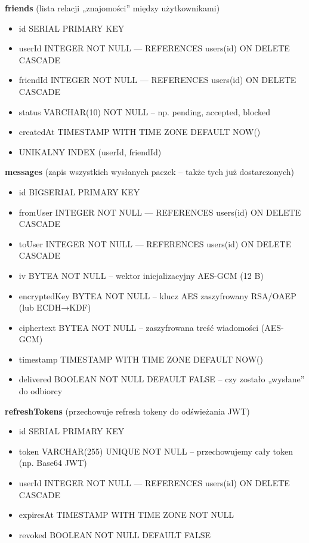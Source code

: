 \documentclass[a4paper,12pt]{article}
\begin{document}
\textbf{friends} (lista relacji „znajomości” między użytkownikami)
\begin{itemize}
    \item id SERIAL PRIMARY KEY
    \item userId INTEGER NOT NULL  — REFERENCES users(id) ON DELETE CASCADE
    \item friendId INTEGER NOT NULL  — REFERENCES users(id) ON DELETE CASCADE
    \item status VARCHAR(10) NOT NULL  – np. pending, accepted, blocked
    \item createdAt TIMESTAMP WITH TIME ZONE DEFAULT NOW()
    \item UNIKALNY INDEX (userId, friendId)
\end{itemize}

\textbf{messages} (zapis wszystkich wysłanych paczek – także tych już dostarczonych)
\begin{itemize}
    \item id BIGSERIAL PRIMARY KEY
    \item fromUser INTEGER NOT NULL  — REFERENCES users(id) ON DELETE CASCADE
    \item toUser INTEGER NOT NULL  — REFERENCES users(id) ON DELETE CASCADE
    \item iv BYTEA NOT NULL  – wektor inicjalizacyjny AES-GCM (12 B)
    \item encryptedKey BYTEA NOT NULL  – klucz AES zaszyfrowany RSA/OAEP (lub ECDH→KDF)
    \item ciphertext BYTEA NOT NULL  – zaszyfrowana treść wiadomości (AES-GCM)
    \item timestamp TIMESTAMP WITH TIME ZONE DEFAULT NOW()
    \item delivered BOOLEAN NOT NULL DEFAULT FALSE  – czy zostało „wysłane” do odbiorcy
\end{itemize}

\textbf{refreshTokens} (przechowuje refresh tokeny do odświeżania JWT)
\begin{itemize}
    \item id SERIAL PRIMARY KEY
    \item token VARCHAR(255) UNIQUE NOT NULL  – przechowujemy cały token (np. Base64 JWT)
    \item userId INTEGER NOT NULL  — REFERENCES users(id) ON DELETE CASCADE
    \item expiresAt TIMESTAMP WITH TIME ZONE NOT NULL
    \item revoked BOOLEAN NOT NULL DEFAULT FALSE
\end{itemize}
\end{document}
